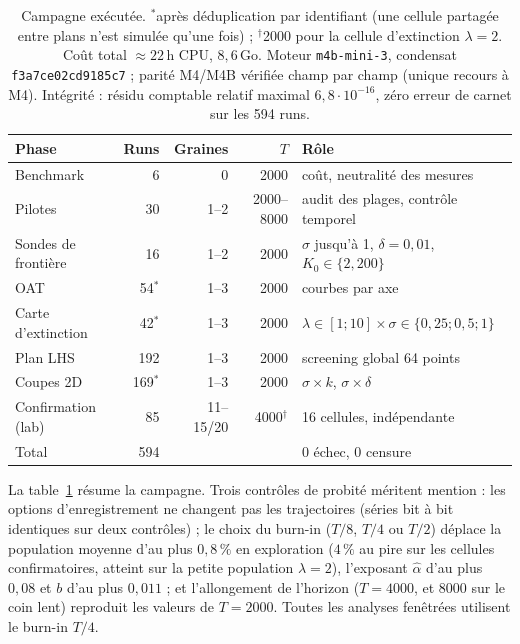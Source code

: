 \documentclass[11pt,a4paper]{article}
\newcommand{\code}[1]{\texttt{#1}}
\begin{document}
\begin{table}[tbh]
\centering
\begin{tabular}{@{}lrrrl@{}}
\toprule
Phase & Runs & Graines & $T$ & Rôle \\
\midrule
Benchmark & 6 & 0 & 2000 & coût, neutralité des mesures \\
Pilotes & 30 & 1--2 & 2000--8000 & audit des plages, contrôle temporel \\
Sondes de frontière & 16 & 1--2 & 2000 & $\sigma$ jusqu'à 1, $\delta=0{,}01$, $K_0\in\{2,200\}$ \\
OAT & 54$^{\ast}$ & 1--3 & 2000 & courbes par axe \\
Carte d'extinction & 42$^{\ast}$ & 1--3 & 2000 & $\lambda\in[1;10]\times\sigma\in\{0{,}25;0{,}5;1\}$ \\
Plan LHS & 192 & 1--3 & 2000 & screening global 64 points \\
Coupes 2D & 169$^{\ast}$ & 1--3 & 2000 & $\sigma\times k$, $\sigma\times\delta$ \\
Confirmation (lab) & 85 & 11--15/20 & 4000$^{\dagger}$ & 16 cellules, indépendante \\
\midrule
Total & 594 & & & 0 échec, 0 censure \\
\bottomrule
\end{tabular}
\caption{Campagne exécutée. $^{\ast}$après déduplication par
identifiant (une cellule partagée entre plans n'est simulée qu'une
fois) ; $^{\dagger}$2000 pour la cellule d'extinction $\lambda=2$.
Coût total $\approx22$\,h CPU, $8{,}6$\,Go. Moteur \code{m4b-mini-3},
condensat \code{f3a7ce02cd9185c7} ; parité M4/M4B vérifiée champ par
champ (unique recours à M4). Intégrité : résidu comptable relatif
maximal $6{,}8\cdot10^{-16}$, zéro erreur de carnet sur les 594 runs.}
\label{tab:campagne}
\end{table}

La table~\ref{tab:campagne} résume la campagne. Trois contrôles de
probité méritent mention : les options d'enregistrement ne changent pas
les trajectoires (séries bit à bit identiques sur deux contrôles) ; le
choix du burn-in ($T/8$, $T/4$ ou $T/2$) déplace la population moyenne
d'au plus $0{,}8\,\%$ en exploration ($4\,\%$ au pire sur les cellules
confirmatoires, atteint sur la petite population $\lambda=2$),
l'exposant $\hat\alpha$ d'au plus $0{,}08$ et $b$ d'au plus $0{,}011$ ;
et l'allongement de l'horizon ($T=4000$, et $8000$ sur le coin lent)
reproduit les valeurs de $T=2000$. Toutes les analyses fenêtrées
utilisent le burn-in $T/4$.
\end{document}
